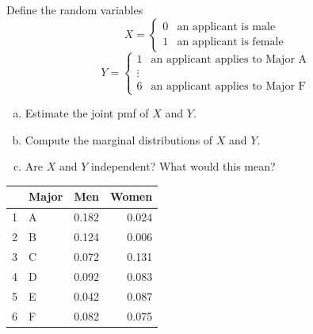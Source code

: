 \begin{frame}
  \begin{block}{\examplectd}
    Define the random variables
    \[
    X=
    \left\{
      \begin{array}{ll}
        0 & \mbox{an applicant is male}\\
        1 & \mbox{an applicant is female}
      \end{array}
    \right.
    \]
    \[
    Y=
    \left\{
      \begin{array}{ll}
        1 & \mbox{an applicant applies to Major A}\\
        \vdots &\\
        6 & \mbox{an applicant applies to Major F}
      \end{array}
    \right.
    \]
    
    \begin{enumerate}[a)]
    \item Estimate the joint pmf of $X$ and $Y$. 
    \item Compute the marginal distributions of $X$ and $Y$. 
    \item Are $X$ and $Y$ independent? What would this mean?
    \end{enumerate}
  \end{block}
\end{frame}

\begin{frame}
  \begin{block}{\examplectd}
\begin{table}[ht]
\centering
\begin{tabular}{rlrr}
  \hline
 & Major & Men & Women \\ 
  \hline
1 & A & 0.182 & 0.024 \\ 
  2 & B & 0.124 & 0.006 \\ 
  3 & C & 0.072 & 0.131 \\ 
  4 & D & 0.092 & 0.083 \\ 
  5 & E & 0.042 & 0.087 \\ 
  6 & F & 0.082 & 0.075 \\ 
   \hline
\end{tabular}
\end{table}

\end{block}
\end{frame}

